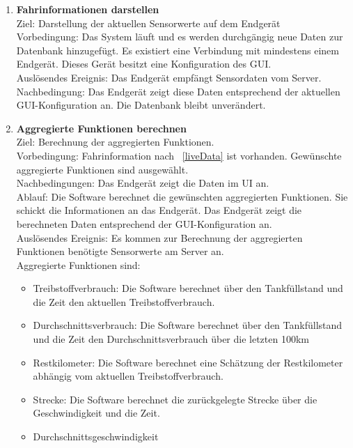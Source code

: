 \documentclass[pflichtenheft.tex]{subfiles}
\begin{document}
	\begin{enumerate}

	\setcounter{enumi}{\value{enumTemp}}


		\item{\textbf{Fahrinformationen darstellen}} \label{liveData} \\ Ziel: Darstellung der aktuellen Sensorwerte auf dem Endgerät \\ Vorbedingung: Das System läuft und es werden durchgängig neue Daten zur Datenbank hinzugefügt. Es existiert eine Verbindung mit mindestens einem Endgerät. Dieses Gerät besitzt eine Konfiguration des GUI. \\ Auslösendes Ereignis: Das Endgerät empfängt Sensordaten vom Server.\\ Nachbedingung: Das Endgerät zeigt diese Daten entsprechend der aktuellen GUI-Konfiguration an. Die Datenbank bleibt unverändert.

		\item{\textbf{Aggregierte Funktionen berechnen}} \\ Ziel: Berechnung der aggregierten Funktionen. \\ Vorbedingung: Fahrinformation nach ~\ref{liveData} ist vorhanden. Gewünschte aggregierte Funktionen sind ausgewählt.\\ Nachbedingungen: Das Endgerät zeigt die Daten im UI an.\\ Ablauf: Die Software berechnet die gewünschten aggregierten Funktionen. Sie schickt die Informationen an das Endgerät. Das Endgerät zeigt die berechneten Daten entsprechend der GUI-Konfiguration an. 
		\\ Auslösendes Ereignis: Es kommen zur Berechnung der aggregierten Funktionen benötigte Sensorwerte am Server an.\\
		Aggregierte Funktionen sind:
		\begin{itemize}
			\item Treibstoffverbrauch: Die Software berechnet über den Tankfüllstand und die Zeit den aktuellen Treibstoffverbrauch.
			\item Durchschnittsverbrauch: Die Software berechnet über den Tankfüllstand und die Zeit den Durchschnittsverbrauch über die letzten 100km
			\item Restkilometer: Die Software berechnet eine Schätzung der Restkilometer abhängig vom aktuellen Treibstoffverbrauch.
			\item Strecke: Die Software berechnet die zurückgelegte Strecke über die Geschwindigkeit und die Zeit.
			\item Durchschnittsgeschwindigkeit
		\end{itemize}


	\setcounter{enumTemp}{\value{enumi}}
	\end{enumerate}
\end{document}
